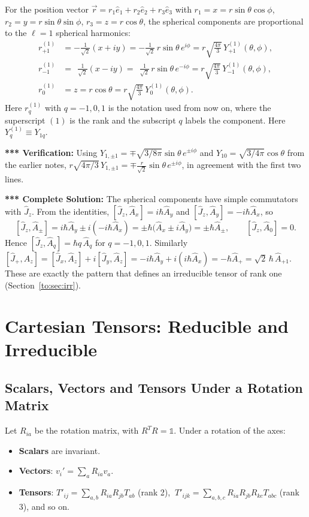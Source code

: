 \documentclass[11pt,a4paper]{article}
\begin{document}
For the position vector $\vec r=r_1\hat e_1+r_2\hat e_2+r_3\hat e_3$ with $r_1=x=r\sin\theta\cos\phi$, $r_2=y=r\sin\theta\sin\phi$, $r_3=z=r\cos\theta$, the spherical components are proportional to the $\ell=1$ spherical harmonics:
\begin{align*}
r^{(1)}_{+1}&=-\tfrac1{\sqrt2}(x+iy)=-\tfrac1{\sqrt2}\,r\sin\theta\,e^{i\phi}=r\sqrt{\tfrac{4\pi}3}\,Y^{(1)}_{+1}(\theta,\phi),\\
r^{(1)}_{-1}&=\ \ \tfrac1{\sqrt2}(x-iy)=\ \ \tfrac1{\sqrt2}\,r\sin\theta\,e^{-i\phi}=r\sqrt{\tfrac{4\pi}3}\,Y^{(1)}_{-1}(\theta,\phi),\\
r^{(1)}_{0}&=z=r\cos\theta=r\sqrt{\tfrac{4\pi}3}\,Y^{(1)}_{0}(\theta,\phi).
\end{align*}
Here $r^{(1)}_q$ with $q=-1,0,1$ is the notation used from now on, where the superscript $(1)$ is the rank and the subscript $q$ labels the component. Here $Y^{(1)}_q\equiv Y_{1q}$.

\textbf{*** Verification:} Using $Y_{1,\pm1}=\mp\sqrt{3/8\pi}\sin\theta\,e^{\pm i\phi}$ and $Y_{10}=\sqrt{3/4\pi}\cos\theta$ from the earlier notes, $r\sqrt{4\pi/3}\,Y_{1,\pm1}=\mp\tfrac r{\sqrt2}\sin\theta\,e^{\pm i\phi}$, in agreement with the first two lines.

\textbf{*** Complete Solution:} The spherical components have simple commutators with $\hat J_z$. From the identities, $[\hat J_z,\hat A_x]=i\hbar\hat A_y$ and $[\hat J_z,\hat A_y]=-i\hbar\hat A_x$, so
\[
[\hat J_z,\hat A_\pm]=i\hbar\hat A_y\pm i(-i\hbar\hat A_x)=\pm\hbar\big(\hat A_x\pm i\hat A_y\big)=\pm\hbar\hat A_\pm,\qquad[\hat J_z,\hat A_0]=0 .
\]
Hence $[\hat J_z,\hat A_q]=\hbar q\,\hat A_q$ for $q=-1,0,1$. Similarly $[\hat J_+,\hat A_z]=[\hat J_x,\hat A_z]+i[\hat J_y,\hat A_z]=-i\hbar\hat A_y+i(i\hbar\hat A_x)=-\hbar\hat A_+=\sqrt2\,\hbar\,\hat A_{+1}$. These are exactly the pattern that defines an irreducible tensor of rank one (Section~\ref{to:sec:irr}).

\section{Cartesian Tensors: Reducible and Irreducible}
\label{to:sec:cart}

\subsection{Scalars, Vectors and Tensors Under a Rotation Matrix}
Let $R_{ia}$ be the rotation matrix, with $R^TR=\mathbb 1$. Under a rotation of the axes:
\begin{itemize}
\item \textbf{Scalars} are invariant.
\item \textbf{Vectors}: $v_i'=\sum_aR_{ia}v_a$.
\item \textbf{Tensors}: $T'_{ij}=\sum_{a,b}R_{ia}R_{jb}T_{ab}$ (rank 2), $\ T'_{ijk}=\sum_{a,b,c}R_{ia}R_{jb}R_{kc}T_{abc}$ (rank 3), and so on.
\end{itemize}
\end{document}
